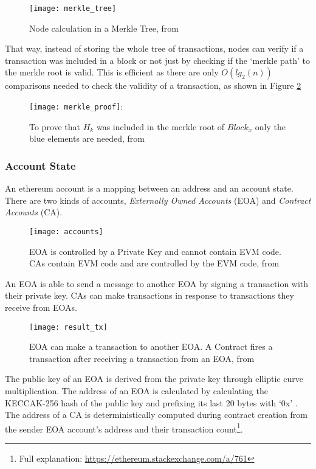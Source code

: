 \begin{figure}[H]
    \centering
    \texttt{[image: merkle\_tree]}
    \caption{Node calculation in a Merkle Tree, from~\cite{smartproperty}}
    \label{fig:merkletree}
\end{figure}

That way, instead of storing the whole tree of transactions, nodes can verify if a transaction was included in a block or not just by checking if the `merkle path' to the merkle root is valid. This is efficient as there are only $O(lg_{2}(n))$ comparisons needed to check the validity of a transaction, as shown in Figure \ref{fig:merkleproof}

\begin{figure}[H]
    \centering
    \texttt{[image: merkle\_proof]}:
    \caption{To prove that $H_{k}$ was included in the merkle root of $Block_{x}$ only the blue elements are needed, from \cite{smartproperty}}
    \label{fig:merkleproof}
\end{figure}

\subsubsection{Account State}
An ethereum account is a mapping between an address and an account state. There are two kinds of accounts, \textit{Externally Owned Accounts} (EOA) and \textit{Contract Accounts} (CA).

\begin{figure}[H]
    \centering
    \texttt{[image: accounts]}
    \caption{EOA is controlled by a Private Key and cannot contain EVM code. CAs contain EVM code and are controlled by the EVM code, from \cite{visual}}
    \label{fig:accounts}
\end{figure}

An EOA is able to send a message to another EOA by signing a transaction with their private key. CAs can make transactions in response to transactions they receive from EOAs. 

\begin{figure}[H]
    \centering
    \texttt{[image: result\_tx]}
    \caption{EOA can make a transaction to another EOA. A Contract fires a transaction after receiving a transaction from an EOA, from \cite{preethi}}
    \label{fig:tx_accounts}
\end{figure}

The public key of an EOA is derived from the private key through elliptic curve multiplication. The address of an EOA is calculated by calculating the KECCAK-256 hash of the public key and prefixing its last 20 bytes with `0x' \cite{ethereum}. The address of a CA is deterministically computed during contract creation from the sender EOA account's address and their transaction count\footnote{Full explanation: \url{https://ethereum.stackexchange.com/a/761}}.

